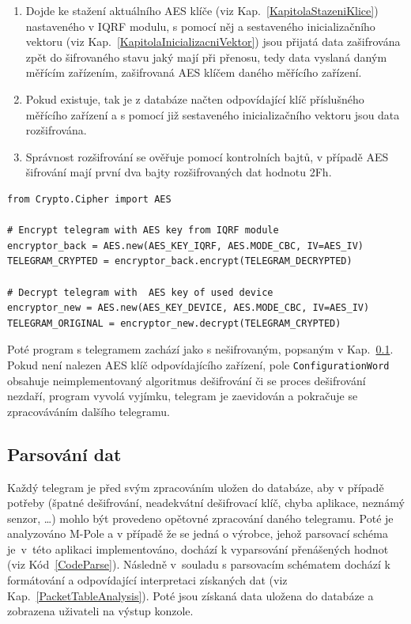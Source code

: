 \begin{enumerate}
	\item Dojde ke stažení aktuálního AES klíče (viz Kap.~\ref{KapitolaStazeniKlice}) nastaveného v IQRF modulu, s pomocí něj a sestaveného inicializačního vektoru (viz Kap.~\ref{KapitolaInicializacniVektor})
jsou přijatá data zašifrována zpět do šifrovaného stavu jaký mají při přenosu, tedy data vyslaná daným měřícím zařízením, zašifrovaná AES klíčem daného měřícího zařízení.
	\item Pokud existuje, tak je z databáze načten odpovídající klíč příslušného měřícího zařízení a s pomocí již sestaveného inicializačního vektoru jsou data rozšifrována.
	\item Správnost rozšifrování se ověřuje pomocí kontrolních bajtů, v případě AES šifrování mají první dva bajty rozšifrovaných dat hodnotu 2Fh.
\end{enumerate}

\begin{lstlisting}[caption={Implementace AES dešifrování},captionpos=b,label=CodeAES,style=MyCodePython]
from Crypto.Cipher import AES

# Encrypt telegram with AES key from IQRF module
encryptor_back = AES.new(AES_KEY_IQRF, AES.MODE_CBC, IV=AES_IV)
TELEGRAM_CRYPTED = encryptor_back.encrypt(TELEGRAM_DECRYPTED)

# Decrypt telegram with  AES key of used device
encryptor_new = AES.new(AES_KEY_DEVICE, AES.MODE_CBC, IV=AES_IV)
TELEGRAM_ORIGINAL = encryptor_new.decrypt(TELEGRAM_CRYPTED)
\end{lstlisting}


Poté program s telegramem zachází jako s nešifrovaným, popsaným v Kap.~\ref{KapitolaParsovani}. Pokud není nalezen AES klíč odpovídajícího zařízení, pole \texttt{ConfigurationWord} obsahuje neimplementovaný algoritmus dešifrování či se proces dešifrování nezdaří, program vyvolá vyjímku, telegram je zaevidován a pokračuje se zpracováváním dalšího telegramu.

\subsection{Parsování dat}
\label{KapitolaParsovani}
Každý telegram je před svým zpracováním uložen do databáze, aby v případě potřeby (špatné dešifrování, neadekvátní dešifrovací klíč, chyba aplikace, neznámý senzor, \ldots) mohlo být provedeno opětovné zpracování daného telegramu. Poté je analyzováno M-Pole a v případě že se jedná o výrobce, jehož parsovací schéma je~v~této aplikaci implementováno, dochází k vyparsování  přenášených hodnot (viz Kód~\ref{CodeParse}). Následně v~souladu s parsovacím schématem dochází k formátování a odpovídající interpretaci získaných dat (viz Kap.~\ref{PacketTableAnalysis}). Poté jsou získaná data uložena do databáze a zobrazena uživateli na výstup konzole.


